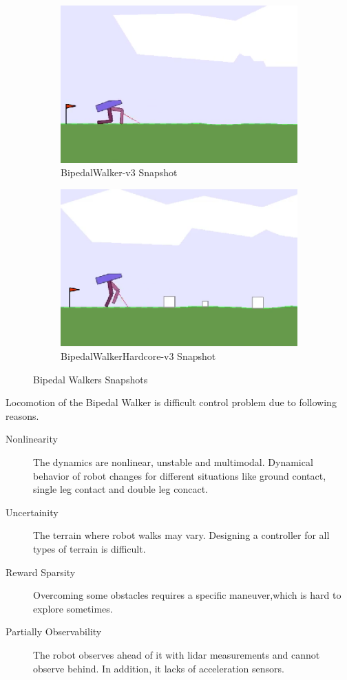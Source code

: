 \begin{figure}
	\begin{subfigure}{.5\textwidth}
		\centering
		\includegraphics[width=0.9\linewidth]{figures/bipedal/classic.png}
		\caption{BipedalWalker-v3 Snapshot}
		\label{fig:bipedal_walker_classic}
	\end{subfigure}
	\begin{subfigure}{.5\textwidth}
		\centering
		\includegraphics[width=0.9\linewidth]{figures/bipedal/hardcore.png}
		\caption{BipedalWalkerHardcore-v3 Snapshot}
		\label{fig:bipedal_walker_hardcore}
	\end{subfigure}
	\caption{Bipedal Walkers Snapshots}
	\label{fig:bipedal_walkers}
\end{figure}

Locomotion of the Bipedal Walker is difficult control problem due to following reasons. 
\begin{description}
	\item[Nonlinearity] The dynamics are nonlinear, unstable and multimodal. 
	Dynamical behavior of robot changes for different situations 
	like ground contact, single leg contact and double leg concact.
	\item[Uncertainity] The terrain where robot walks may vary. 
	Designing a controller for all types of terrain is difficult.
	\item[Reward Sparsity] Overcoming some obstacles requires a specific maneuver,which is hard to explore sometimes.	
	\item[Partially Observability] The robot observes 
	ahead of it with lidar measurements and cannot observe behind. 
	In addition, it lacks of acceleration sensors.
\end{description}

